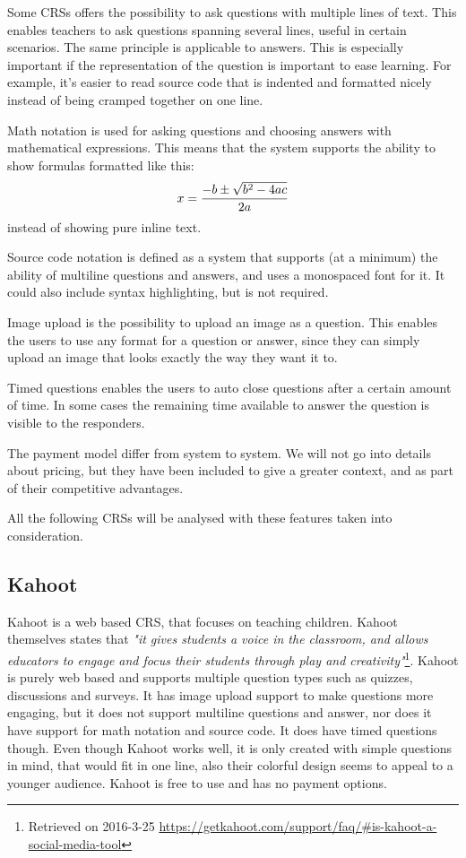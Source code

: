 Some CRSs offers the possibility to ask questions with multiple lines of text. This enables teachers to ask questions spanning several lines, useful in certain scenarios. The same principle is applicable to answers. This is especially important if the representation of the question is important to ease learning. For example, it's easier to read source code that is indented and formatted nicely instead of being cramped together on one line.

Math notation is used for asking questions and choosing answers with mathematical expressions. This means that the system supports the ability to show formulas formatted like this: $$x = {-b \pm \sqrt{b^2-4ac} \over 2a}$$ instead of showing pure inline text. 

Source code notation is defined as a system that supports (at a minimum) the ability of multiline questions and answers, and uses a monospaced font for it. It could also include syntax highlighting, but is not required. 

Image upload is the possibility to upload an image as a question. This enables the users to use any format for a question or answer, since they can simply upload an image that looks exactly the way they want it to.

Timed questions enables the users to auto close questions after a certain amount of time. In some cases the remaining time available to answer the question is visible to the responders.

The payment model differ from system to system. We will not go into details about pricing, but they have been included to give a greater context, and as part of their competitive advantages.

All the following CRSs will be analysed with these features taken into consideration.

\subsection*{Kahoot}
Kahoot is a web based CRS, that focuses on teaching children. Kahoot themselves states that  \emph{"it gives students a voice in the classroom, and allows educators to engage and focus their students through play and creativity"}\footnote{Retrieved on 2016-3-25 \url{https://getkahoot.com/support/faq/\#is-kahoot-a-social-media-tool}}. Kahoot is purely web based and supports multiple question types such as quizzes, discussions and surveys. It has image upload support to make questions more engaging, but it does not support multiline questions and answer, nor does it have support for math notation and source code. It does have timed questions though. Even though Kahoot works well, it is only created with simple questions in mind, that would fit in one line, also their colorful design seems to appeal to a younger audience. Kahoot is free to use and has no payment options.

